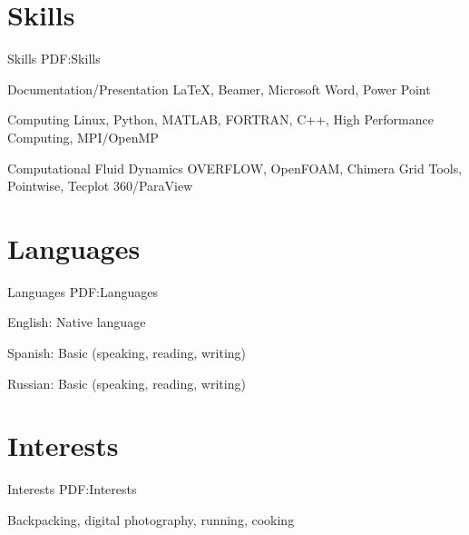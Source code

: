 \documentclass[letterpaper,MMMyyyy,nonstop]{simpleresumecv}
\begin{document}
\begin{body}






\section
{Skills}
{Skills}
{PDF:Skills}

Documentation/Presentation
\BulletItem
{\LaTeX},
Beamer,
Microsoft Word, Power Point

\GapNoBreak
Computing
\BulletItem
Linux,
Python,
MATLAB,
FORTRAN,
C++,
High Performance Computing,
MPI/OpenMP

\GapNoBreak
Computational Fluid Dynamics
\BulletItem
OVERFLOW,
OpenFOAM,
Chimera Grid Tools,
Pointwise,
Tecplot 360/ParaView



\section
{Languages}
{Languages}
{PDF:Languages}

\BulletItem
English: Native language

\GapNoBreak
\BulletItem
Spanish: Basic (speaking, reading, writing)

\GapNoBreak
\BulletItem
Russian: Basic (speaking, reading, writing)


\section
{Interests}
{Interests}
{PDF:Interests}

Backpacking,
digital photography,
running,
cooking


\end{body}
\end{document}
